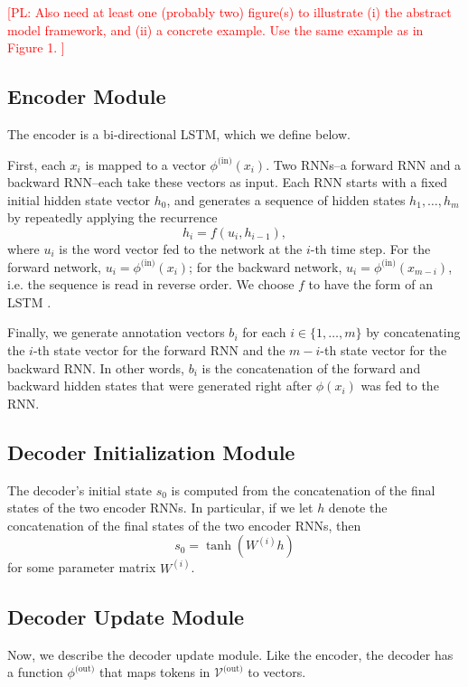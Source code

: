 \documentclass[11pt,letterpaper]{article}
\newcommand{\phiin}{\phi^{\text{(in)}}}
\newcommand{\vocabout}{\mathcal{V}^{\text{(out)}}}
\newcommand{\phiout}{\phi^{\text{(out)}}}
\newcommand\pl[1]{\textcolor{red}{[PL: #1]}}
\begin{document}

\pl{
  Also need at least one (probably two) figure(s)
  to illustrate (i) the abstract model framework,
  and (ii) a concrete example.  Use the same example as in Figure 1.
}

\subsection{Encoder Module}
The encoder is a bi-directional LSTM, which we define below.

First, each $x_i$ is mapped to a vector $\phiin(x_i)$.
Two RNNs--a forward RNN and a backward RNN--each take these vectors as input.
Each RNN starts with a fixed initial hidden state vector $h_0$, and 
generates a sequence of hidden states $h_1, \dotsc, h_m$ by
repeatedly applying the recurrence \[
  h_i = f(u_i, h_{i-1}),
\]
where $u_i$ is the word vector fed to the network at the $i$-th time step.
For the forward network, $u_i = \phiin(x_i)$; for the
backward network, $u_i = \phiin(x_{m-i})$, i.e. the sequence is read in reverse order.
We choose $f$ to have the form of an LSTM \cite{hochreiter1997lstm}.

Finally, we generate annotation vectors $b_i$ for each 
$i \in \{1, \dotsc, m\}$ by concatenating the 
$i$-th state vector for the forward RNN and 
the $m-i$-th state vector for the backward RNN.  
In other words, $b_i$ is the concatenation of the forward
and backward hidden states that were generated
right after $\phi(x_i)$ was fed to the RNN.

\subsection{Decoder Initialization Module}
The decoder's initial state $s_0$ is computed from 
the concatenation of the final states of the two encoder RNNs.
In particular, if we let $h$ denote the
concatenation of the final states of the two encoder RNNs, then
\[
  s_0 = \tanh(W^{(i)} h)
\]
for some parameter matrix $W^{(i)}$.

\subsection{Decoder Update Module}
Now, we describe the decoder update module.
Like the encoder, the decoder has a function $\phiout$
that maps tokens in $\vocabout$ to vectors.
\end{document}
